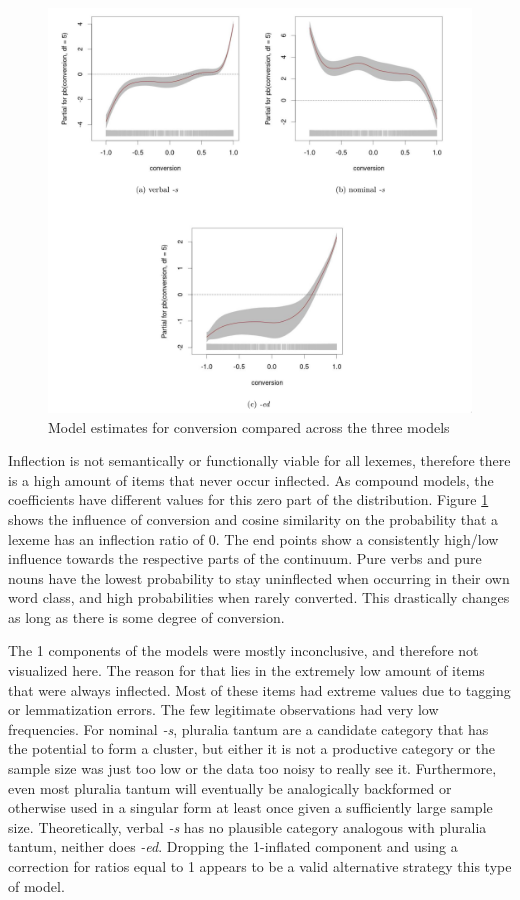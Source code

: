 \documentclass[
]{article}
\begin{document}
\begin{figure}[t!]
    \centering
    \includegraphics[width=\textwidth]{figures/docx_subfigures_3.png}
    \caption{Model estimates for conversion compared across the three models}
    \label{zero}
\end{figure}

Inflection is not semantically or functionally viable for all lexemes,
therefore there is a high amount of items that never occur inflected. As
compound models, the coefficients have different values for this zero
part of the distribution. Figure \ref{zero} shows the influence of
conversion and cosine similarity on the probability that a lexeme has an
inflection ratio of 0. The end points show a consistently high/low
influence towards the respective parts of the continuum. Pure verbs and
pure nouns have the lowest probability to stay uninflected when
occurring in their own word class, and high probabilities when rarely
converted. This drastically changes as long as there is some degree of
conversion.

The 1 components of the models were mostly inconclusive, and therefore
not visualized here. The reason for that lies in the extremely low
amount of items that were always inflected. Most of these items had
extreme values due to tagging or lemmatization errors. The few
legitimate observations had very low frequencies. For nominal \emph{-s},
pluralia tantum are a candidate category that has the potential to form
a cluster, but either it is not a productive category or the sample size
was just too low or the data too noisy to really see it. Furthermore,
even most pluralia tantum will eventually be analogically backformed or
otherwise used in a singular form at least once given a sufficiently
large sample size. Theoretically, verbal \emph{-s} has no plausible
category analogous with pluralia tantum, neither does \emph{-ed}.
Dropping the 1-inflated component and using a correction for ratios
equal to 1 appears to be a valid alternative strategy this type of
model.
\end{document}
